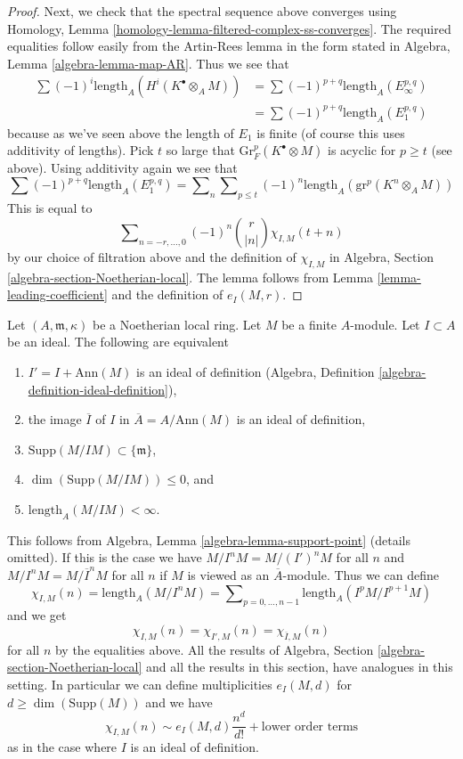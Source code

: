 \begin{proof}
\medskip\noindent
Next, we check that the spectral sequence above converges
using Homology, Lemma \ref{homology-lemma-filtered-complex-ss-converges}.
The required equalities follow easily from the Artin-Rees lemma
in the form stated in Algebra, Lemma \ref{algebra-lemma-map-AR}.
Thus we see that
\begin{align*}
\sum (-1)^i\text{length}_A(H^i(K^\bullet \otimes_A M))
& =
\sum (-1)^{p + q} \text{length}_A(E_\infty^{p, q}) \\
& =
\sum (-1)^{p + q} \text{length}_A(E_1^{p, q})
\end{align*}
because as we've seen above the length of $E_1$ is finite
(of course this uses additivity of lengths). Pick $t$ so
large that $\text{Gr}^p_F(K^\bullet \otimes M)$
is acyclic for $p \geq t$ (see above). Using
additivity again we see that
$$
\sum (-1)^{p + q} \text{length}_A(E_1^{p, q}) =
\sum\nolimits_n \sum\nolimits_{p \leq t}
(-1)^n \text{length}_A(\text{gr}^p(K^n \otimes_A M))
$$
This is equal to
$$
\sum\nolimits_{n = -r, \ldots, 0} (-1)^n{r \choose |n|} \chi_{I, M}(t + n)
$$
by our choice of filtration above and the definition of $\chi_{I, M}$ in
Algebra, Section \ref{algebra-section-Noetherian-local}.
The lemma follows from Lemma \ref{lemma-leading-coefficient}
and the definition of $e_I(M, r)$.
\end{proof}

\begin{remark}
\label{remark-trivial-generalization}
Let $(A, \mathfrak m, \kappa)$ be a Noetherian local ring.
Let $M$ be a finite $A$-module. Let $I \subset A$ be an ideal.
The following are equivalent
\begin{enumerate}
\item $I' = I + \text{Ann}(M)$ is an ideal of definition
(Algebra, Definition \ref{algebra-definition-ideal-definition}),
\item the image $\overline{I}$ of $I$ in $\overline{A} = A/\text{Ann}(M)$
is an ideal of definition,
\item $\text{Supp}(M/IM) \subset \{\mathfrak m\}$,
\item $\dim(\text{Supp}(M/IM)) \leq 0$, and
\item $\text{length}_A(M/IM) < \infty$.
\end{enumerate}
This follows from Algebra, Lemma \ref{algebra-lemma-support-point}
(details omitted). If this is the case we have $M/I^nM = M/(I')^nM$
for all $n$ and $M/I^nM = M/\overline{I}^nM$ for all $n$
if $M$ is viewed as an $\overline{A}$-module.
Thus we can define
$$
\chi_{I, M}(n) = \text{length}_A(M/I^nM) =
\sum\nolimits_{p = 0, \ldots, n - 1} \text{length}_A(I^pM/I^{p + 1}M)
$$
and we get
$$
\chi_{I, M}(n) = \chi_{I', M}(n) = \chi_{\overline{I}, M}(n)
$$
for all $n$ by the equalities above.
All the results of Algebra, Section \ref{algebra-section-Noetherian-local}
and all the results in this section, have analogues in this setting.
In particular we can define multiplicities $e_I(M, d)$ for
$d \geq \dim(\text{Supp}(M))$ and we have
$$
\chi_{I, M}(n) \sim e_I(M, d) \frac{n^d}{d!} + \text{lower order terms}
$$
as in the case where $I$ is an ideal of definition.
\end{remark}




